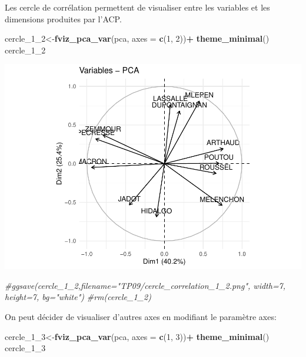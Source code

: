 \documentclass[
]{book}
\newenvironment{Shaded}{\begin{snugshade}}{\end{snugshade}}
\newcommand{\AttributeTok}[1]{\textcolor[rgb]{0.13,0.29,0.53}{#1}}
\newcommand{\CommentTok}[1]{\textcolor[rgb]{0.56,0.35,0.01}{\textit{#1}}}
\newcommand{\DecValTok}[1]{\textcolor[rgb]{0.00,0.00,0.81}{#1}}
\newcommand{\FunctionTok}[1]{\textcolor[rgb]{0.13,0.29,0.53}{\textbf{#1}}}
\newcommand{\NormalTok}[1]{#1}
\newcommand{\OtherTok}[1]{\textcolor[rgb]{0.56,0.35,0.01}{#1}}
\newcommand{\SpecialCharTok}[1]{\textcolor[rgb]{0.81,0.36,0.00}{\textbf{#1}}}
\begin{document}
Les cercle de corrélation permettent de visualiser entre les variables et les dimensions produites par l'ACP.

\begin{Shaded}
\begin{Highlighting}[]
\NormalTok{cercle\_1\_2}\OtherTok{\textless{}{-}}\FunctionTok{fviz\_pca\_var}\NormalTok{(pca,  }\AttributeTok{axes =} \FunctionTok{c}\NormalTok{(}\DecValTok{1}\NormalTok{, }\DecValTok{2}\NormalTok{))}\SpecialCharTok{+}
  \FunctionTok{theme\_minimal}\NormalTok{()}
\NormalTok{cercle\_1\_2}
\end{Highlighting}
\end{Shaded}

\includegraphics{manuel_geo_quanti_files/figure-latex/unnamed-chunk-62-1.pdf}

\begin{Shaded}
\begin{Highlighting}[]
\CommentTok{\#ggsave(cercle\_1\_2,filename="TP09/cercle\_correlation\_1\_2.png", width=7, height=7, bg="white")}
\CommentTok{\#rm(cercle\_1\_2)}
\end{Highlighting}
\end{Shaded}

On peut décider de visualiser d'autres axes en modifiant le paramètre axes:

\begin{Shaded}
\begin{Highlighting}[]
\NormalTok{cercle\_1\_3}\OtherTok{\textless{}{-}}\FunctionTok{fviz\_pca\_var}\NormalTok{(pca,  }\AttributeTok{axes =} \FunctionTok{c}\NormalTok{(}\DecValTok{1}\NormalTok{, }\DecValTok{3}\NormalTok{))}\SpecialCharTok{+}
  \FunctionTok{theme\_minimal}\NormalTok{()}
\NormalTok{cercle\_1\_3}
\end{Highlighting}
\end{Shaded}
\end{document}
